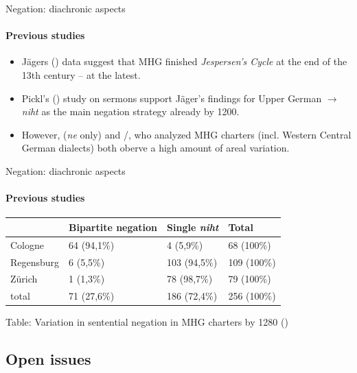\documentclass[xcolor=table, compress, %
handout
]{beamer}
\begin{document}
\begin{frame}{Negation: diachronic aspects}
\framesubtitle{Previous studies}

\begin{itemize}
    \item Jägers (\citeyear{jaeger08}) data suggest that MHG finished \textit{Jespersen's Cycle} at the end of the 13th century – at the latest.
    \item Pickl’s (\citeyear{Pickl2017}) study on sermons support Jäger’s findings for Upper German $\rightarrow$ \textit{niht} as the main negation strategy already by 1200.
    \item However, \citet{witzenhausen19} (\textit{ne} only) and \citet{schueler16}/\citet{HertelimErscheinen}, who analyzed MHG charters (incl. Western Central German dialects) both oberve a high amount of areal variation.
\end{itemize}

\end{frame}

\begin{frame}{Negation: diachronic aspects}
\framesubtitle{Previous studies}

\begin{center}
\begin{tabular}{l l l l}
\toprule
 & \textbf{Bipartite negation} & \textbf{Single \textit{niht}} & \textbf{Total}\\
\hline
Cologne & 64 (94,1\%) & 4 (5,9\%) & 68 (100\%)\\
Regensburg & 6 (5,5\%) & 103 (94,5\%) & 109 (100\%)\\
Zürich & 1 (1,3\%) & 78 (98,7\%) & 79 (100\%)\\
\hline
total & 71 (27,6\%) & 186 (72,4\%) & 256 (100\%)\\
\bottomrule
\end{tabular}
\end{center}
\begin{small}
\begin{center}\smallskip
Table: Variation in sentential negation in MHG charters by 1280 (\citealt[98]{schueler16})\end{center}
\end{small}
\end{frame}


\subsection{Open issues}
\end{document}
